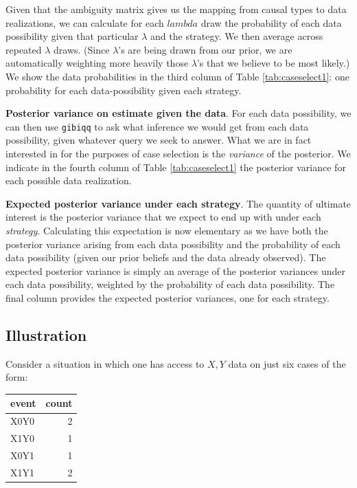 \documentclass[12pt,]{book}
\begin{document}
Given that the ambiguity matrix gives us the mapping from causal types to data realizations, we can calculate for each \(lambda\) draw the probability of each data possibility given that particular \(\lambda\) and the strategy. We then average across repeated \(\lambda\) draws. (Since \(\lambda\)'s are being drawn from our prior, we are automatically weighting more heavily those \(\lambda\)'s that we believe to be most likely.) We show the data probabilities in the third column of Table \ref{tab:caseselect1}: one probability for each data-possibility given each strategy.

\textbf{Posterior variance on estimate given the data}. For each data possibility, we can then use \texttt{gibiqq} to ask what inference we would get from each data possibility, given whatever query we seek to answer. What we are in fact interested in for the purposes of case selection is the \emph{variance} of the posterior. We indicate in the fourth column of Table \ref{tab:caseselect1} the posterior variance for each possible data realization.

\textbf{Expected posterior variance under each strategy}. The quantity of ultimate interest is the posterior variance that we expect to end up with under each \emph{strategy}. Calculating this expectation is now elementary as we have both the posterior variance arising from each data possibility and the probability of each data possibility (given our prior beliefs and the data already observed). The expected posterior variance is simply an average of the posterior variances under each data possibility, weighted by the probability of each data possibility. The final column provides the expected posterior variances, one for each strategy.

\hypertarget{illustration-2}{%
\subsection{Illustration}\label{illustration-2}}

Consider a situation in which one has access to \(X,Y\) data on just six cases of the form:

\begin{tabular}{l|r}
\hline
event & count\\
\hline
X0Y0 & 2\\
\hline
X1Y0 & 1\\
\hline
X0Y1 & 1\\
\hline
X1Y1 & 2\\
\hline
\end{tabular}
\end{document}
